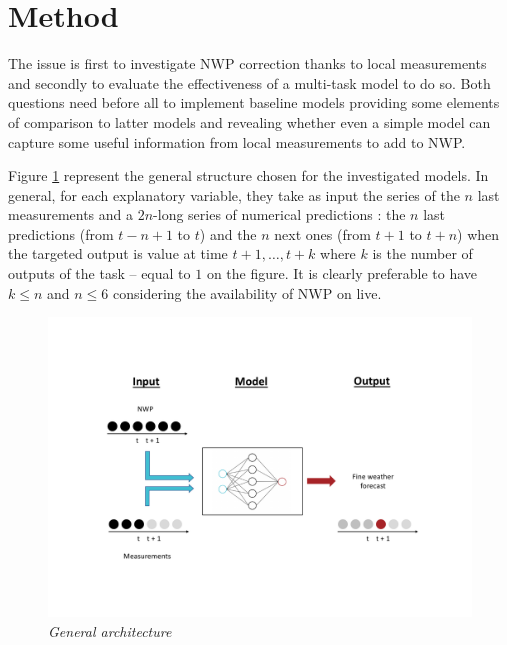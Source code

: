 \documentclass{article}
\newcommand{\saut}{\vspace{10px}}
\begin{document}
\section{Method}

The issue is first to investigate NWP correction thanks to local measurements and secondly to evaluate
the effectiveness of a multi-task model to do so. Both questions need before all to implement baseline models
providing some elements of comparison to latter models and revealing whether even a simple model can
capture some useful information from local measurements to add to NWP.

\saut

Figure \ref{fig:Fig. 1} represent the general structure chosen for the investigated models. In general, for each
explanatory variable, they take
as input the series of the $n$ last measurements and a $2n$-long series of numerical predictions : the $n$ last
predictions (from $t - n + 1$ to $t$) and the $n$ next ones (from $t + 1$ to $t + n$) when the targeted output is
value at time $t + 1, \dots, t + k$ where $k$ is the number of outputs of the task -- equal to $1$ on the figure.
It is clearly preferable to have $k \leq n$ and $n \leq 6$ considering the availability of NWP on live.


\vspace{-30px}

\begin{figure}[H]
    \centering
    \includegraphics[width=\linewidth]{img/structure.pdf}
    \vspace{-30px}
    \caption{\textit{General architecture}}
   \label{fig:Fig. 1}
\end{figure}
\end{document}
